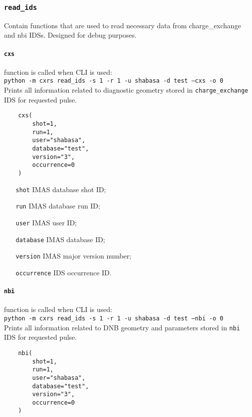 \documentclass[../../main]{subfiles}
\begin{document}
\subsubsection{\texttt{read\_ids}}

Contain functions that are used to read necessary data from charge\_exchange and nbi IDSs. Designed for debug purposes.

\paragraph{\texttt{cxs}} function is called when CLI is used:\\
\texttt{python -m cxrs read_ids -s 1 -r 1 -u shabasa -d test --cxs -o 0}\\
Prints all information related to diagnostic geometry stored in \texttt{charge\_exchange} IDS for requested pulse.

\begin{verbatim}
    cxs(
        shot=1,
        run=1,
        user="shabasa",
        database="test",
        version="3",
        occurrence=0
    )
\end{verbatim}

\begin{itemize}[align=left]
    \item[\texttt{shot}] IMAS database shot ID;
    \item[\texttt{run}] IMAS database run ID;
    \item[\texttt{user}] IMAS user ID;
    \item[\texttt{database}] IMAS database ID;
    \item[\texttt{version}] IMAS major version number;
    \item[\texttt{occurrence}] IDS occurrence ID.
\end{itemize}

\paragraph{\texttt{nbi}} function is called when CLI is used:\\
\texttt{python -m cxrs read_ids -s 1 -r 1 -u shabasa -d test --nbi -o 0}\\
Prints all information related to DNB geometry and parameters stored in \texttt{nbi} IDS for requested pulse.

\begin{verbatim}
    nbi(
        shot=1,
        run=1,
        user="shabasa",
        database="test",
        version="3",
        occurrence=0
    )
\end{verbatim}
\end{document}
